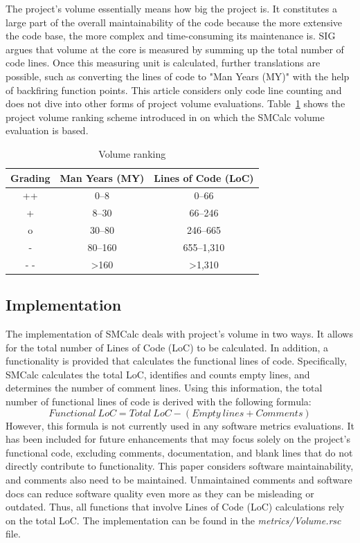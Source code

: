 \documentclass[11pt]{report}
\begin{document}
The project's volume essentially means how big the project is. It constitutes a large part of the overall maintainability of the code because the more extensive the code base, the more complex and time-consuming its maintenance is. SIG argues \cite{Heitlager2007} that volume at the core is measured by summing up the total number of code lines. Once this measuring unit is calculated, further translations are possible, such as converting the lines of code to "Man Years (MY)" with the help of backfiring function points. This article considers only code line counting and does not dive into other forms of project volume evaluations. Table~\ref{tab:volume-ranking} shows the project volume ranking scheme introduced in \cite{Heitlager2007} on which the SMCalc volume evaluation is based.

\begin{table}[H]
    \centering
    \begin{tabular}{|c|c|c|}
        \hline
        \textbf{Grading} & \textbf{Man Years (MY)} & \textbf{Lines of Code (LoC)} \\ \hline
        ++ & 0--8 & 0--66 \\ \hline
        + & 8--30 & 66--246 \\ \hline
        o & 30--80 & 246--665 \\ \hline
        - & 80--160 & 655--1,310 \\ \hline
        - - & \textgreater 160 & \textgreater 1,310 \\ \hline
    \end{tabular}
    \caption{Volume ranking}
    \label{tab:volume-ranking}
\end{table}

\subsection{Implementation}
\label{subsec:volume-implementation}

The implementation of SMCalc deals with project's volume in two ways. It allows for the total number of Lines of Code (LoC) to be calculated. In addition, a functionality is provided that calculates the functional lines of code. Specifically, SMCalc calculates the total LoC, identifies and counts empty lines, and determines the number of comment lines. Using this information, the total number of functional lines of code is derived with the following formula:
\[
\mathit{Functional\ LoC} = \mathit{Total\ LoC} - \left( Empty\ lines + Comments \right)
\]
However, this formula is not currently used in any software metrics evaluations. It has been included for future enhancements that may focus solely on the project's functional code, excluding comments, documentation, and blank lines that do not directly contribute to functionality. This paper considers software maintainability, and comments also need to be maintained. Unmaintained comments and software docs can reduce software quality even more as they can be misleading or outdated. Thus, all functions that involve Lines of Code (LoC) calculations rely on the total LoC. The implementation can be found in the \textit{metrics/Volume.rsc} file.
\end{document}
